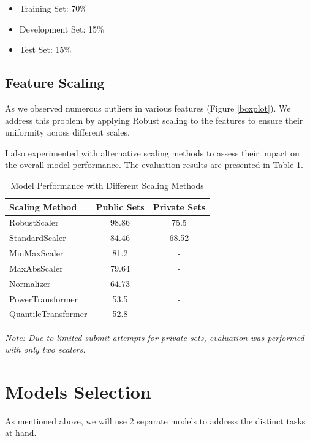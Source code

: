 \documentclass[conference]{IEEEtran}
\begin{document}
\begin{itemize}
    \item Training Set: 70\%
    \item Development Set: 15\%
    \item Test Set: 15\%
\end{itemize}

\subsection{Feature Scaling}
As we observed numerous outliers in various features (Figure \ref{boxplot}). We address this problem by applying \href{https://scikit-learn.org/stable/modules/generated/sklearn.preprocessing.RobustScaler.html}{Robust scaling} to the features to ensure their uniformity across different scales. 

I also experimented with alternative scaling methods to assess their impact on the overall model performance. The evaluation results are presented in Table \ref{tab:model_performance}.

\begin{table}[h]
    \centering
    \caption{Model Performance with Different Scaling Methods}
    \begin{tabular}{lcc}
    \toprule
    \textbf{Scaling Method} & \textbf{Public Sets} & \textbf{Private Sets} \\
    \midrule
    RobustScaler & 98.86 & 75.5 \\
    StandardScaler & 84.46 & 68.52 \\
    MinMaxScaler & 81.2 & - \\
    MaxAbsScaler & 79.64 & - \\
    Normalizer & 64.73 & - \\
    PowerTransformer & 53.5 & - \\
    QuantileTransformer & 52.8 & - \\
    \bottomrule
    \end{tabular}
    \begin{flushleft}
        \small\textit{Note: Due to limited submit attempts for private sets, evaluation was performed with only two scalers.}
        \end{flushleft}
    \label{tab:model_performance}
    \end{table}
    
\section{Models Selection}
As mentioned above, we will use 2 separate models to address the distinct tasks at hand.
\end{document}

